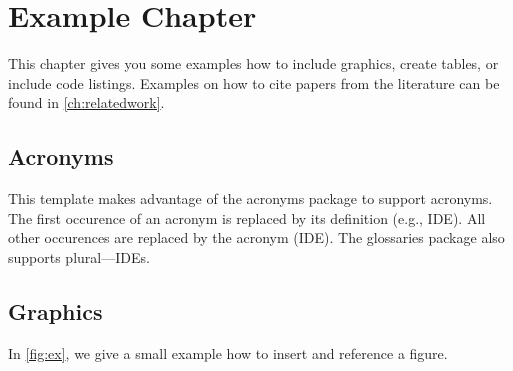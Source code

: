 \chapter{Example Chapter}\label{ch:example_chapter}

This chapter gives you some examples how to include graphics, create tables, or include code listings.
Examples on how to cite papers from the literature can be found in \autoref{ch:relatedwork}.

\section{Acronyms}

This template makes advantage of the acronyms package to support acronyms. The first occurence of an acronym is replaced by its definition (e.g., \ac{IDE}). All other occurences are replaced by the acronym (\ac{IDE}). The glossaries package also supports plural---\acp{IDE}.

\section{Graphics}

In \autoref{fig:ex}, we give a small example how to insert and reference a figure.

